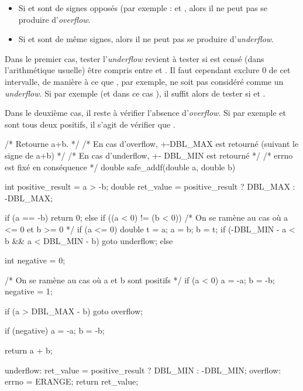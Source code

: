 \begin{itemize}
\item
  Si  et  sont de signes opposés (par exemple :
   et ,
  alors il ne peut pas se produire d'\emph{overflow}.
\item
  Si  et  sont de même signes, alors il ne peut pas
  se produire d'\emph{underflow}.
\end{itemize}

Dans le premier cas, tester l'\emph{underflow} revient à tester si
 est censé (dans l'arithmétique usuelle) être compris
entre  et . Il faut cependant exclure
0 de cet intervalle, de manière à ce que , par
exemple, ne soit pas considéré comme un \emph{underflow}. Si par exemple
 (et dans ce cas
), il suffit alors de tester si
 et
.

Dans le deuxième cas, il reste à vérifier l'absence d'\emph{overflow}.
Si par exemple  et  sont tous deux positifs, il
s'agit de vérifier que .

\begin{C}
/* Retourne a+b. */
/* En cas d'overflow, +-DBL_MAX est retourné (suivant le signe de a+b) */
/* En cas d'underflow, +- DBL_MIN est retourné */
/* errno est fixé en conséquence */
double safe_addf(double a, double b)
{
    int positive_result = a > -b;
    double ret_value = positive_result ? DBL_MAX : -DBL_MAX;

    if (a == -b)
        return 0;
    else if ((a < 0) != (b < 0))
    {
        /* On se ramène au cas où a <= 0 et b >= 0 */
        if (a <= 0)
        {
            double t = a;
            a = b;
            b = t;
        }
        if (-DBL_MIN - a < b && a < DBL_MIN - b) 
            goto underflow;
    }
    else 
    {
        int negative = 0;

        /* On se ramène au cas où a et b sont positifs */   
        if (a < 0)
        {
            a = -a;
            b = -b;
            negative = 1;
        }

        if (a > DBL_MAX - b)    
            goto overflow;

        if (negative)
        {
            a = -a;
            b = -b;
        }
    }

    return a + b;

underflow:
    ret_value = positive_result ? DBL_MIN : -DBL_MIN;       
overflow:
    errno = ERANGE;
    return ret_value;
}
\end{C}

